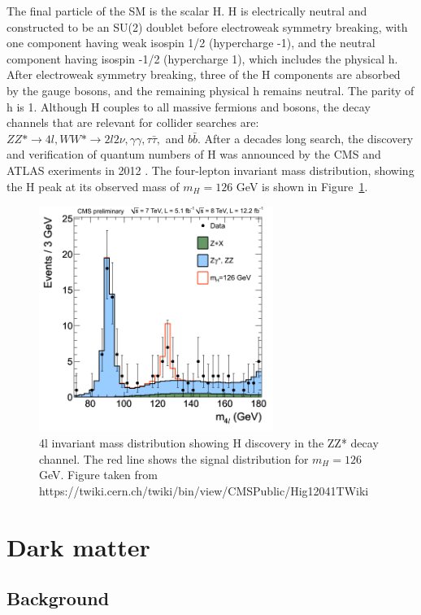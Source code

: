\indent The final particle of the SM is the scalar H. H is electrically neutral and constructed to be an SU(2) doublet before electroweak symmetry breaking, with one component having weak isospin 1/2 (hypercharge -1), and the neutral component having isospin -1/2 (hypercharge 1), which includes the physical h. After electroweak symmetry breaking, three of the H components are absorbed by the gauge bosons, and the remaining physical h remains neutral. The parity of h is 1. Although H couples to all massive fermions and bosons, the decay channels that are relevant for collider searches are: $ZZ* \rightarrow 4l, WW* \rightarrow 2l2\nu, \gamma\gamma, \tau\bar{\tau},$ and $b\bar{b}$. After a decades long search, the discovery and verification of quantum numbers of H was announced by the CMS and ATLAS exeriments in 2012 \cite{Chatrchyan:2012xdj, Aad:2012tfa}. The four-lepton invariant mass distribution, showing the H peak at its observed mass of $m_H = 126$ GeV is shown in Figure~\ref{4l}.

\begin{figure}[tbh]
\centering
\includegraphics[width=3in]{figures/ZZMass_7Plus8TeV_70-180_3GeV.png}
\caption{4l invariant mass distribution showing H discovery in the ZZ* decay channel. The red line shows the signal distribution for $m_H=126$ GeV. Figure taken from https://twiki.cern.ch/twiki/bin/view/CMSPublic/Hig12041TWiki}
\label{4l}
\end{figure}


\section{Dark matter}

\subsection{Background}

